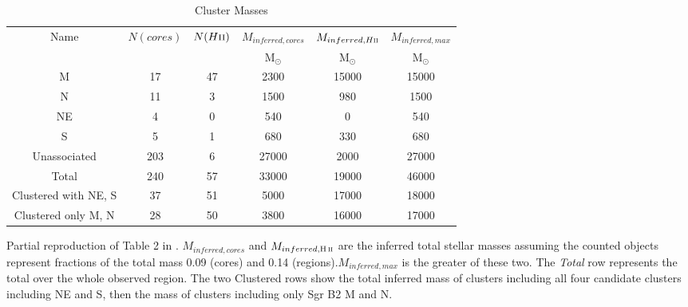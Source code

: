 \begin{table*}[htp]
\centering
\caption{Cluster Masses}
\begin{tabular}{cccccc}
\label{tab:clustermassestimates}
Name & $N(cores)$ & $N(H\textsc{ii})$ & $M_{inferred, cores}$ & $M_{inferred, H\textsc{ii}}$ & $M_{inferred,max}$ \\
 &  &  & $\mathrm{M_{\odot}}$ & $\mathrm{M_{\odot}}$ & $\mathrm{M_{\odot}}$ \\
\hline
M & 17 & 47 & 2300 & 15000 & 15000 \\
N & 11 & 3 & 1500 & 980 & 1500 \\
NE & 4 & 0 & 540 & 0 & 540 \\
S & 5 & 1 & 680 & 330 & 680 \\
Unassociated & 203 & 6 & 27000 & 2000 & 27000 \\
Total & 240 & 57 & 33000 & 19000 & 46000 \\
Clustered with NE, S & 37 & 51 & 5000 & 17000 & 18000 \\
Clustered only M, N & 28 & 50 & 3800 & 16000 & 17000 \\
\hline
\end{tabular}
\par
Partial reproduction of Table 2 in \citet{Ginsburg2018a}. $M_{inferred,cores}$ and $M_{inferred,\hii}$ are the inferred total stellar masses assuming the counted objects represent fractions of the total mass 0.09 (cores) and 0.14 (\hii regions).$M_{inferred,max}$ is the greater of these two.    The \emph{Total} row represents the total over the whole observed region.    The two Clustered rows show the total inferred mass of clusters including all four candidate clusters including NE and S, then the mass of clusters including only Sgr B2 M and N.
\end{table*}
